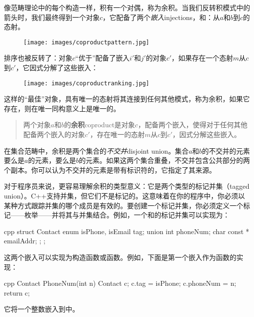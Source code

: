 像范畴理论中的每个构造一样，积有一个对偶，称为余积。当我们反转积模式中的箭头时，我们最终得到一个对象$c$，它配备了两个\emph{嵌入}{injections}，和：从$a$和$b$到$c$的态射。


\begin{figure}[H]
  \centering
  \texttt{[image: images/coproductpattern.jpg]}
\end{figure}

\noindent
排序也被反转了：对象$c$“优于”配备了嵌入$i'$和$j'$的对象$c'$，如果存在一个态射$m$从$c$到$c'$，它因式分解了这些嵌入：


\begin{figure}[H]
  \centering
  \texttt{[image: images/coproductranking.jpg]}
\end{figure}

\noindent
这样的“最佳”对象，具有唯一的态射将其连接到任何其他模式，称为余积，如果它存在，则在唯一同构意义上是唯一的。

\begin{quote}
  两个对象$a$和$b$的\textbf{余积}{coproduct}是对象$c$，配备两个嵌入，使得对于任何其他配备两个嵌入的对象$c'$，存在唯一的态射$m$从$c$到$c'$，因式分解这些嵌入。
\end{quote}

\noindent
在集合范畴中，余积是两个集合的\emph{不交并}{disjoint union}。集合$a$和$b$的不交并的元素要么是$a$的元素，要么是$b$的元素。如果这两个集合重叠，不交并包含公共部分的两个副本。你可以认为不交并的元素是带有标识符的，它指定了其来源。

对于程序员来说，更容易理解余积的类型意义：它是两个类型的标记并集（tagged union）。C++支持并集，但它们不是标记的。这意味着在你的程序中，你必须以某种方式跟踪并集的哪个成员是有效的。要创建一个标记并集，你必须定义一个标记——枚举——并将其与并集结合。例如，一个和的标记并集可以实现为：

\begin{snip}{cpp}
  struct Contact {
    enum { isPhone, isEmail } tag;
    union { int phoneNum; char const * emailAddr; };
  };
\end{snip}
这两个嵌入可以实现为构造函数或函数。例如，下面是第一个嵌入作为函数的实现：

\begin{snip}{cpp}
  Contact PhoneNum(int n) {
    Contact c;
    c.tag = isPhone;
    c.phoneNum = n;
    return c;
  }
\end{snip}
它将一个整数嵌入到中。

